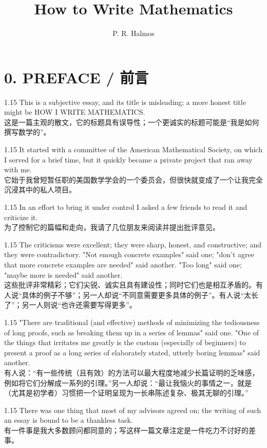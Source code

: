 \documentclass[12pt,a4paper]{article}
\newcommand{\bilingual}[2]{
    \begin{spacing}{1.15} %
        \noindent \normalsize #1 \\[-0.5ex] %
        \small \textcolor{blue!70!black}{#2} %
    \end{spacing}
    \vspace{0.8em} %
}
\begin{document}
\title{How to Write Mathematics} %
\author{P. R. Halmos} %
\date{} %
\maketitle %
\section*{0. PREFACE / 前言} %

\bilingual{This is a subjective essay, and its title is misleading; a more honest title might be HOW I WRITE MATHEMATICS.}
{这是一篇主观的散文，它的标题具有误导性；一个更诚实的标题可能是“我是如何撰写数学的”。} %

\bilingual{It started with a committee of the American Mathematical Society, on which I served for a brief time, but it quickly became a private project that ran away with me.}
{它始于我曾短暂任职的美国数学学会的一个委员会，但很快就变成了一个让我完全沉浸其中的私人项目。} %

\bilingual{In an effort to bring it under control I asked a few friends to read it and criticize it.}
{为了控制它的篇幅和走向，我请了几位朋友来阅读并提出批评意见。} %

\bilingual{The criticisms were excellent; they were sharp, honest, and constructive; and they were contradictory. "Not enough concrete examples" said one; "don't agree that more concrete examples are needed" said another. "Too long" said one; "maybe more is needed" said another.}
{这些批评非常精彩；它们尖锐、诚实且具有建设性；同时它们也是相互矛盾的。有人说“具体的例子不够”；另一人却说“不同意需要更多具体的例子”。有人说“太长了”；另一人则说“也许还需要写得更多”。} %

\bilingual{"There are traditional (and effective) methods of minimizing the tediousness of long proofs, such as breaking them up in a series of lemmas" said one. "One of the things that irritates me greatly is the custom (especially of beginners) to present a proof as a long series of elaborately stated, utterly boring lemmas" said another.}
{有人说：“有一些传统（且有效）的方法可以最大程度地减少长篇证明的乏味感，例如将它们分解成一系列的引理。”另一人却说：“最让我恼火的事情之一，就是（尤其是初学者）习惯把一个证明呈现为一长串陈述复杂、极其无聊的引理。”} %

\bilingual{There was one thing that most of my advisors agreed on; the writing of such an essay is bound to be a thankless task.}
{有一件事是我大多数顾问都同意的；写这样一篇文章注定是一件吃力不讨好的差事。} %
\end{document}
